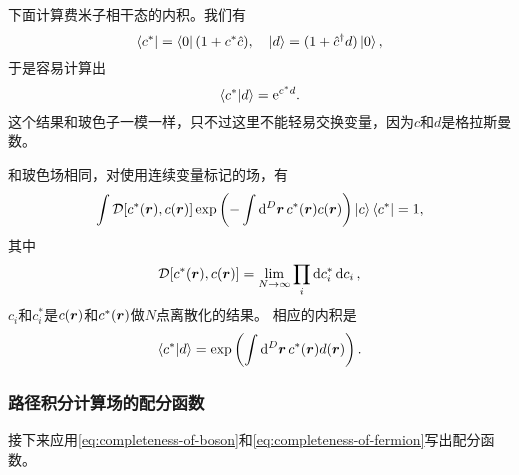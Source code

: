 \documentclass[hyperref, UTF8, a4paper]{ctexart}
\newcommand*{\ee}{\mathrm{e}}
\newcommand*{\fd}[1]{\mathcal{D}{#1}}
\begin{document}
下面计算费米子相干态的内积。我们有
\[
    \bra{c^*} = \bra{0} (1 + c^* \hat{c}), \quad \ket{d} = (1 + \hat{c}^\dagger d) \ket{0},
\]
于是容易计算出
\[
    \braket{c^*}{d} = \ee^{c^* d}.
\]
这个结果和玻色子一模一样，只不过这里不能轻易交换变量，因为$c$和$d$是格拉斯曼数。

和玻色场相同，对使用连续变量标记的场，有
\begin{equation}
    \int \fd{[c^*(\vb*{r}), c(\vb*{r})]} \exp \left( - \int \dd[D]{\vb*{r}} c^*(\vb*{r}) c(\vb*{r}) \right) \ket{c} \bra{c^*} = 1,
    \label{eq:completeness-of-fermion}
\end{equation}
其中
\begin{equation}
    \fd{[c^*(\vb*{r}), c(\vb*{r})]} = \lim_{N\to \infty} \prod_i \dd{c^*_i} \dd{c_i},
\end{equation}
$c_i$和$c_i^*$是$c(\vb*{r})$和$c^*(\vb*{r})$做$N$点离散化的结果。
相应的内积是
\begin{equation}
    \braket{c^*}{d} = \exp \left( \int \dd[D]{\vb*{r}} c^*(\vb*{r}) d(\vb*{r}) \right).
\end{equation}

\subsubsection{路径积分计算场的配分函数}

接下来应用\eqref{eq:completeness-of-boson}和\eqref{eq:completeness-of-fermion}写出配分函数。
\end{document}
